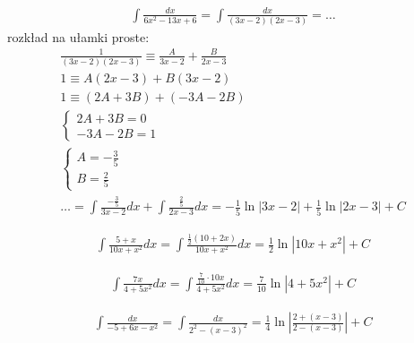 
\begin{gather*}\int \frac{dx}{6x^2-13x+6} = \int \frac{dx}{(3x-2)(2x-3)} = \ldots\end{gather*}
rozkład na ułamki proste:
\begin{gather*}\frac{1}{(3x-2)(2x-3)} \equiv \frac{A}{3x-2}+\frac{B}{2x-3} \\
1 \equiv A(2x-3)+B(3x-2) \\
1 \equiv (2A+3B)+(-3A-2B) \\
\begin{cases} 2A+3B=0 \\ -3A-2B=1 \end{cases} \\
\begin{cases} A=-\frac{3}{5} \\ B=\frac{2}{5} \end{cases} \\
\ldots = \int \frac{-\frac{3}{5}}{3x-2}dx + \int \frac{\frac{2}{5}}{2x-3}dx = -\frac{1}{5}\ln|3x-2|+\frac{1}{5}\ln|2x-3|+C\end{gather*}



\begin{gather*}\int \frac{5+x}{10x+x^2}dx = \int \frac{\frac{1}{2}(10+2x)}{10x+x^2}dx = \frac{1}{2}\ln|10x+x^2|+C\end{gather*}



\begin{gather*}\int \frac{7x}{4+5x^2}dx = \int \frac{\frac{7}{10} \cdot 10x}{4+5x^2}dx = \frac{7}{10}\ln|4+5x^2|+C\end{gather*}



\begin{gather*}
  \int \frac{dx}{-5+6x-x^2}
  = \int \frac{dx}{2^2-(x-3)^2}
  = \frac{1}{4}\ln\left|\frac{2+(x-3)}{2-(x-3)}\right|+C
\end{gather*}



